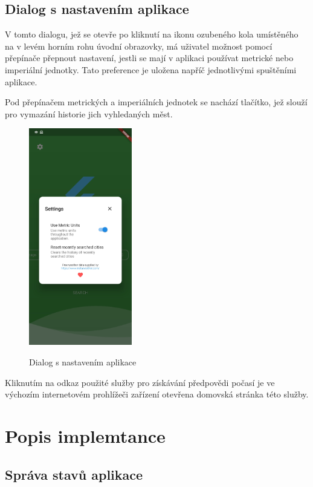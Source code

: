 \documentclass[12pt, a4paper]{article}
\let\oldsection\section
\renewcommand\section{\clearpage\oldsection}
\begin{document}
\subsection{Dialog s nastavením aplikace}

V tomto dialogu, jež se otevře po kliknutí na ikonu ozubeného kola umístěného na v levém horním rohu úvodní obrazovky, má uživatel možnost pomocí přepínače přepnout nastavení, jestli se mají v aplikaci používat metrické nebo imperiální jednotky. Tato preference je uložena napříč jednotlivými spuštěními aplikace.

Pod přepínačem metrických a imperiálních jednotek se nachází tlačítko, jež slouží pro vymazání historie jich vyhledaných měst.

\begin{figure}[!ht]
\centering
{\includegraphics[width=0.40\textwidth]{img/app-settings.jpg}}
\caption{Dialog s nastavením aplikace}
\label{fig:flutter-architecture}
\end{figure}

Kliknutím na odkaz použité služby pro získávání předpovědi počasí je ve výchozím internetovém prohlížeči zařízení otevřena domovská stránka této služby.

\section{Popis implemtance}


\subsection{Správa stavů aplikace}
\end{document}
